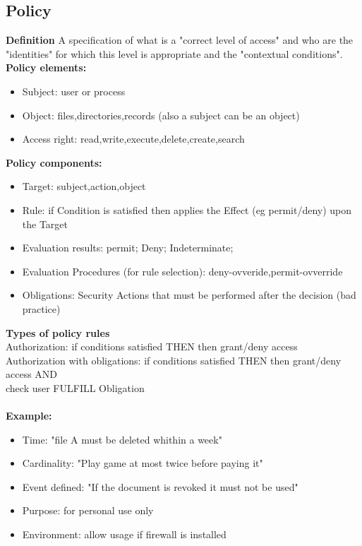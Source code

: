 \documentclass[10pt,a4paper]{book}
\begin{document}
\subsection{Policy}
\textbf{Definition} A specification of what is a "correct level of access" and who are the "identities" for which this level is appropriate and the "contextual conditions".\\
\textbf{Policy elements:}
\begin{itemize}
\item Subject: user or process
\item Object: files,directories,records (also a subject can be an object)
\item Access right: read,write,execute,delete,create,search
\end{itemize}
\textbf{Policy components:}
\begin{itemize}
\item Target: subject,action,object
\item Rule: if Condition is satisfied then applies the Effect (eg permit/deny) upon the Target
\item Evaluation results: permit; Deny; Indeterminate;
\item Evaluation Procedures (for rule selection): deny-ovveride,permit-ovverride
\item Obligations: Security Actions that must be performed after the decision (bad practice)
\end{itemize}

\textbf{Types of policy rules}\\
Authorization: if conditions satisfied THEN then grant/deny access\\
Authorization with obligations: if conditions satisfied THEN then grant/deny access AND \\
check user FULFILL Obligation\\\\
\textbf{Example:}
\begin{itemize}
\item Time: "file A must be deleted whithin a week"
\item Cardinality: "Play game at most twice before paying it"
\item Event defined: "If the document is revoked it must not be used"
\item Purpose: for personal use only
\item Environment: allow usage if firewall is installed
\end{itemize}
\end{document}
